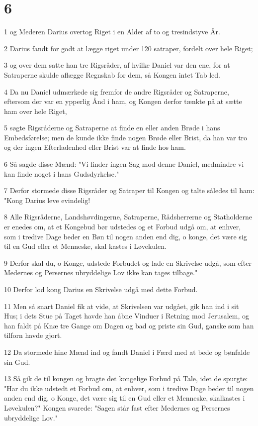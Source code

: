 \chapter{6}

\par 1 og Mederen Darius overtog Riget i en Alder af to og tresindstyve År.
\par 2 Darius fandt for godt at lægge riget under 120 satraper, fordelt over hele Riget;
\par 3 og over dem satte han tre Rigsråder, af hvilke Daniel var den ene, for at Satraperne skulde aflægge Regnskab for dem, så Kongen intet Tab led.
\par 4 Da nu Daniel udmærkede sig fremfor de andre Rigsråder og Satraperne, eftersom der var en ypperlig Ånd i ham, og Kongen derfor tænkte på at sætte ham over hele Riget,
\par 5 søgte Rigsråderne og Satraperne at finde en eller anden Brøde i hans Embedsførelse; men de kunde ikke finde nogen Brøde eller Brist, da han var tro og der ingen Efterladenhed eller Brist var at finde hos ham.
\par 6 Så sagde disse Mænd: "Vi finder ingen Sag mod denne Daniel, medmindre vi kan finde noget i hans Gudsdyrkelse."
\par 7 Derfor stormede disse Rigsråder og Satraper til Kongen og talte således til ham: "Kong Darius leve evindelig!
\par 8 Alle Rigsråderne, Landshøvdingerne, Satraperne, Rådsherrerne og Statholderne er enedes om, at et Kongebud bør udstedes og et Forbud udgå om, at enhver, som i tredive Dage beder en Bøn til nogen anden end dig, o konge, det være sig til en Gud eller et Menneske, skal kastes i Løvekulen.
\par 9 Derfor skal du, o Konge, udstede Forbudet og lade en Skrivelse udgå, som efter Medernes og Persernes ubryddelige Lov ikke kan tages tilbage."
\par 10 Derfor lod kong Darius en Skrivelse udgå med dette Forbud.
\par 11 Men så snart Daniel fik at vide, at Skrivelsen var udgået, gik han ind i sit Hus; i dets Stue på Taget havde han åbne Vinduer i Retning mod Jerusalem, og han faldt på Knæ tre Gange om Dagen og bad og priste sin Gud, ganske som han tilforn havde gjort.
\par 12 Da stormede hine Mænd ind og fandt Daniel i Færd med at bede og bønfalde sin Gud.
\par 13 Så gik de til kongen og bragte det kongelige Forbud på Tale, idet de spurgte: "Har du ikke udstedt et Forbud om, at enhver, som i tredive Dage beder til nogen anden end dig, o Konge, det være sig til en Gud eller et Menneske, skalkastes i Løvekulen?" Kongen svarede: "Sagen står fast efter Medernes og Persernes ubryddelige Lov."
